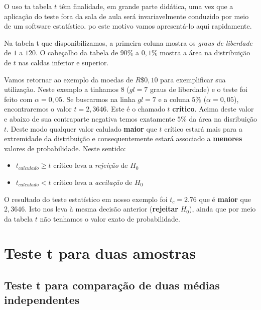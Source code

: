 \documentclass[
]{book}
\providecommand{\tightlist}{%
  \setlength{\itemsep}{0pt}\setlength{\parskip}{0pt}}
\begin{document}
O uso ta tabela \(t\) têm finalidade, em grande parte didática, uma vez que a aplicação do teste fora da sala de aula será invariavelmente conduzido por meio de um software estatístico. po este motivo vamos apresentá-lo aqui rapidamente.

Na tabela t que disponibilizamos, a primeira coluna mostra os \emph{graus de liberdade} de \(1\) a \(120\). O cabeçalho da tabela de \(90\%\) a \(0,1\%\) mostra a área na distribuição de \(t\) nas caldas inferior e superior.

Vamos retornar ao exemplo da moedas de \(R\$0,10\) para exemplificar sua utilização. Neste exemplo a tinhamos \(8\) (\(gl = 7\) graus de liberdade) e o teste foi feito com \(\alpha =0,05\). Se buscarmos na linha \(gl = 7\) e a coluna \(5\%\) (\(\alpha = 0,05\)), encontraremos o valor \(t = 2,3646\). Este é o chamado \(t\) \textbf{crítico}. Acima deste valor e abaixo de sua contraparte negativa temos exatamente \(5\%\) da área na disribuição \(t\). Deste modo qualquer valor calulado \textbf{maior} que \(t\) crítico estará mais para a extremidade da distribuição e consequentemente estará associado a \textbf{menores} valores de probabilidade. Neste sentido:

\begin{itemize}
\tightlist
\item
  \(t_{calculado} \ge t\) crítico leva a \emph{rejeição} de \(H_0\)
\item
  \(t_{calculado} < t\) crítico leva a \emph{aceitação} de \(H_0\)
\end{itemize}

O resultado do teste estatístico em nosso exemplo foi \(t_c = 2.76\) que é \textbf{maior} que \(2,3646\). Isto nos leva à mesma decisão anterior (\textbf{rejeitar} \(H_0\)), ainda que por meio da tabela \(t\) não tenhamos o valor exato de probabilidade.

\hypertarget{testet}{%
\chapter{Teste t para duas amostras}\label{testet}}

\hypertarget{teste-t-para-comparauxe7uxe3o-de-duas-muxe9dias-independentes}{%
\section{Teste t para comparação de duas médias independentes}\label{teste-t-para-comparauxe7uxe3o-de-duas-muxe9dias-independentes}}
\end{document}
